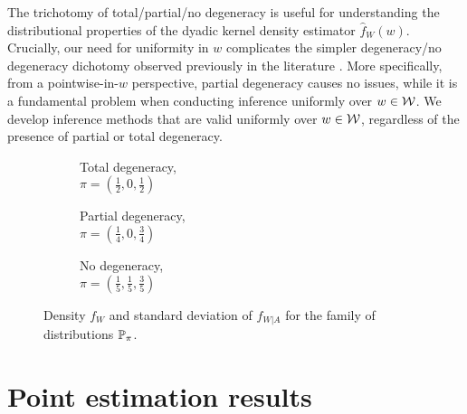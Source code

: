 The trichotomy of total/partial/no  degeneracy is useful for understanding the
distributional properties of the dyadic kernel density estimator
$\widehat{f}_W(w)$. Crucially, our need for uniformity in $w$ complicates the
simpler degeneracy/no degeneracy dichotomy observed previously in the literature
\citep{graham2022kernel}.
More specifically,
from a pointwise-in-$w$ perspective,
partial degeneracy causes no issues,
while it is a fundamental problem
when conducting inference uniformly over $w \in \cW$.
We develop inference methods
that are valid uniformly over $w \in \cW$,
regardless of the presence of partial or total degeneracy.

\begin{figure}[ht]
  \captionsetup[subfigure]{justification=centering}
  \centering
  \begin{subfigure}{0.32\textwidth}
    \centering
    \caption{
      Total degeneracy, \\
      $\pi = \left( \frac{1}{2}, 0, \frac{1}{2} \right)$
    }
  \end{subfigure}
  \begin{subfigure}{0.32\textwidth}
    \centering
    \caption{
      Partial degeneracy, \\
      $\pi = \left( \frac{1}{4}, 0, \frac{3}{4} \right)$
    }
  \end{subfigure}
  \begin{subfigure}{0.32\textwidth}
    \centering
    \caption{
      No degeneracy, \\
      $\pi = \left( \frac{1}{5}, \frac{1}{5}, \frac{3}{5} \right)$
    }
  \end{subfigure}
  \caption{
    Density $f_W$ and standard deviation
    of $f_{W|A}$ for the family of distributions $\P_\pi$.\\
  }
  \label{fig:distribution}
\end{figure}

\section{Point estimation results}\label{sec:point_estimation}

